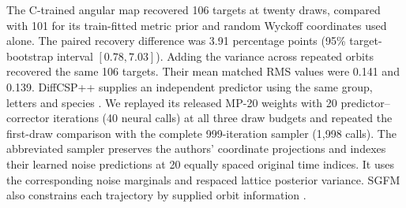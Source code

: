 \begin{table}[!htbp]\centering\footnotesize\setlength{\tabcolsep}{3.4pt}
\caption{Prediction from the same supplied Wyckoff templates on 128 test targets. MR (\%) and mean best normalized RMS use ordered raw draws. RMS averages the matched targets. Valid (\%) is the structural-validity fraction among all draws. Retained is the number of the first 16 targets whose first draw retains the requested subgroup after unconstrained CHGNet relaxation at 0.01\,\AA. The native DiffCSP++ row evaluates one draw.}\label{tab:wyckoff}
\end{table}
The C-trained angular map recovered 106 targets at twenty draws, compared with 101 for its train-fitted metric prior and random Wyckoff coordinates used alone. The paired recovery difference was 3.91 percentage points (95\% target-bootstrap interval $[0.78,7.03]$). Adding the variance across repeated orbits recovered the same 106 targets. Their mean matched RMS values were 0.141 and 0.139.
DiffCSP++ supplies an independent predictor using the same group, letters and species \cite{diffcspplus}. We replayed its released MP-20 weights with 20 predictor--corrector iterations (40 neural calls) at all three draw budgets and repeated the first-draw comparison with the complete 999-iteration sampler (1,998 calls). The abbreviated sampler preserves the authors' coordinate projections and indexes their learned noise predictions at 20 equally spaced original time indices. It uses the corresponding noise marginals and respaced lattice posterior variance. SGFM also constrains each trajectory by supplied orbit information \cite{sgfm}.

